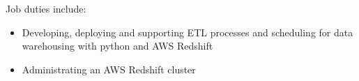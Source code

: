 \normalsize
Job duties include:
\small
\begin{itemize}
    \item Developing, deploying and supporting ETL processes and scheduling for data warehousing with python and AWS Redshift
    \item Administrating an AWS Redshift cluster
\end{itemize}
\normalsize
\medskip
